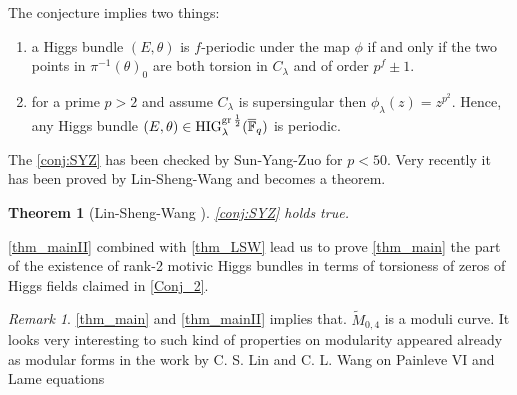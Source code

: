 \documentclass[12pt,twoside]{book}
\theoremstyle{plain}
\newtheorem{theorem}{Theorem}[section]
\theoremstyle{definition}
\theoremstyle{remark}
\newtheorem{remark}[remark]{Remark}
\newcommand{\bF}{{\mathbb F}}
\numberwithin{equation}{section}
\def\High{{\mathrm{HIG}^{{\rm gr}\,{1\over 2}}_{\lambda}}}
\begin{document}
The conjecture implies two things:
\begin{enumerate}
\item a Higgs bundle $(E,\theta)$ is $f$-periodic under the map $\phi$ if and only if the two points in $\pi^{-1}(\theta)_0$ are both torsion in $C_\lambda$ and of order $p^f\pm1$.
\item for a prime $p>2$ and assume $C_\lambda$ is supersingular then $\phi_\lambda(z)=z^{p^2}$. Hence, any Higgs bundle $(E,\theta)\in {\High}(\overline{\bF}_{q})$ is periodic.
\end{enumerate}

The \autoref{conj:SYZ} has been checked by Sun-Yang-Zuo for $p<50$. Very recently it has been proved by
Lin-Sheng-Wang and becomes a theorem.
\begin{theorem} [Lin-Sheng-Wang \cite{LSW22}] \label{thm_LSW}
\autoref{conj:SYZ} holds true.
\end{theorem}
\autoref{thm_mainII} combined with \autoref{thm_LSW} lead us to prove \autoref{thm_main} the part of the existence of
rank-2 motivic Higgs bundles in terms of torsioness of zeros of Higgs fields claimed in \autoref{Conj_2}.
\begin{remark}
\autoref{thm_main} and \autoref{thm_mainII} implies that. $\widetilde M_{0,4}$ is a moduli curve. It looks very interesting to such kind of properties on modularity appeared already as modular forms in the work by C. S. Lin and C. L. Wang on Painleve VI and Lame equations \cite{LiWa10}
\end{remark}
\end{document}
